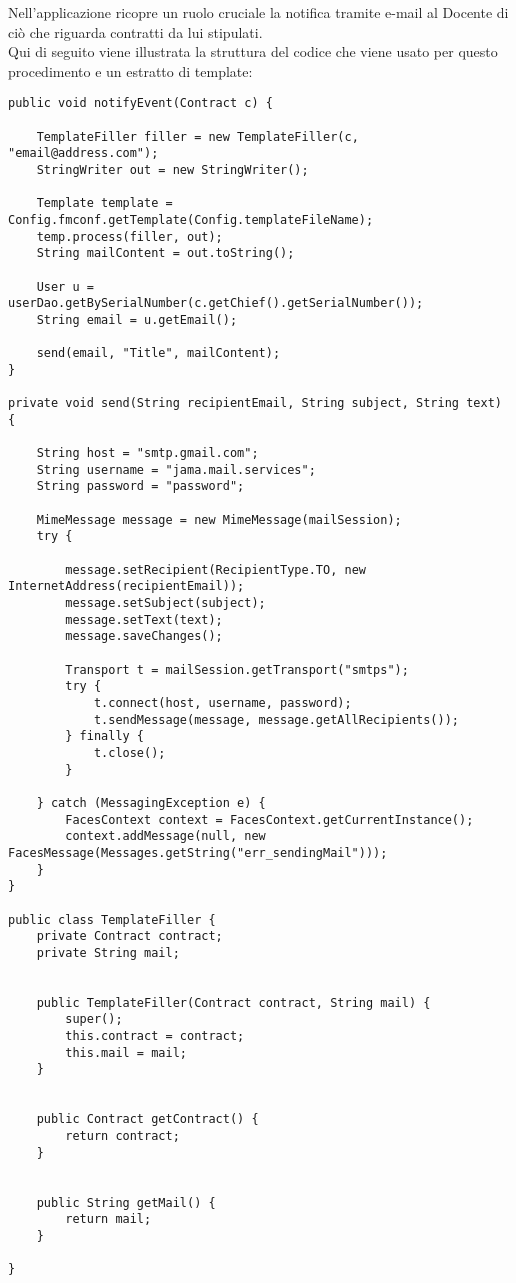Nell'applicazione ricopre un ruolo cruciale la notifica tramite e-mail al Docente di ciò che riguarda contratti da lui stipulati.\\
Qui di seguito viene illustrata la struttura del codice che viene usato per questo procedimento e un estratto di template:

\begin{lstlisting}
public void notifyEvent(Contract c) {
	
	TemplateFiller filler = new TemplateFiller(c, "email@address.com");
	StringWriter out = new StringWriter();

	Template template = Config.fmconf.getTemplate(Config.templateFileName);
	temp.process(filler, out);
	String mailContent = out.toString();

	User u = userDao.getBySerialNumber(c.getChief().getSerialNumber());
	String email = u.getEmail();

	send(email, "Title", mailContent);
}

private void send(String recipientEmail, String subject, String text) {

	String host = "smtp.gmail.com";
	String username = "jama.mail.services";
	String password = "password";

	MimeMessage message = new MimeMessage(mailSession);
	try {

		message.setRecipient(RecipientType.TO, new InternetAddress(recipientEmail));
		message.setSubject(subject);
		message.setText(text);
		message.saveChanges();

		Transport t = mailSession.getTransport("smtps");
		try {
			t.connect(host, username, password);
			t.sendMessage(message, message.getAllRecipients());
		} finally {
			t.close();
		}

	} catch (MessagingException e) {
		FacesContext context = FacesContext.getCurrentInstance();
		context.addMessage(null, new FacesMessage(Messages.getString("err_sendingMail")));
	}
}

public class TemplateFiller {
	private Contract contract;
	private String mail;


	public TemplateFiller(Contract contract, String mail) {
		super();
		this.contract = contract;
		this.mail = mail;
	}


	public Contract getContract() {
		return contract;
	}


	public String getMail() {
		return mail;
	}

}
\end{lstlisting}


